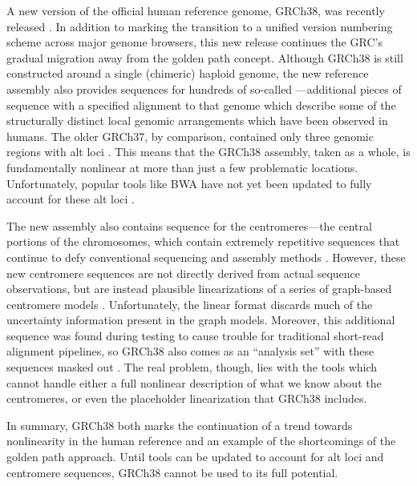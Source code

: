 \documentclass[11pt,proposal]{ucthesis}
\begin{document}
A new version of the official human reference genome, GRCh38, was recently released \cite{karolchik2014new}. In addition to marking the transition to a unified version numbering scheme across major genome browsers, this new release continues the GRC's gradual migration away from the golden path concept. Although GRCh38 is still constructed around a single (chimeric) haploid genome, the new reference assembly also provides sequences for hundreds of so-called ---additional pieces of sequence with a specified alignment to that genome which describe some of the structurally distinct local genomic arrangements which have been observed in humans. The older GRCh37, by comparison, contained only three genomic regions with alt loci \cite{church2011modernizing}. This means that the GRCh38 assembly, taken as a whole, is fundamentally nonlinear at more than just a few problematic locations. Unfortunately, popular tools like BWA have not yet been updated to fully account for these alt loci \cite{li2014bwa}.

The new assembly also contains sequence for the centromeres---the central portions of the chromosomes, which contain extremely repetitive sequences that continue to defy conventional sequencing and assembly methods \cite{karolchik2014new}. However, these new centromere sequences are not directly derived from actual sequence observations, but are instead plausible linearizations of a series of graph-based centromere models \cite{miga2014centromere}. Unfortunately, the linear format discards much of the uncertainty information present in the graph models. Moreover, this additional sequence was found during testing to cause trouble for traditional short-read alignment pipelines, so GRCh38 also comes as an ``analysis set'' with these sequences masked out \cite{karolchik2014new}. The real problem, though, lies with the tools which cannot handle either a full nonlinear description of what we know about the centromeres, or even the placeholder linearization that GRCh38 includes.

In summary, GRCh38 both marks the continuation of a trend towards nonlinearity in the human reference and an example of the shortcomings of the golden path approach. Until tools can be updated to account for alt loci and centromere sequences, GRCh38 cannot be used to its full potential.


    
    
\end{document}

